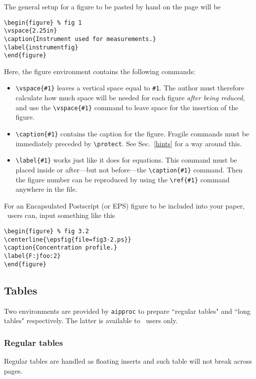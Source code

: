 The general setup for a figure to be pasted by hand  on the page will be
\se\begin{verbatim}
\begin{figure} % fig 1
\vspace{2.25in}
\caption{Instrument used for measurements.}
\label{instrumentfig}
\end{figure}
\end{verbatim}\ee
\noindent 
Here, the figure environment contains the following commands:
\begin{itemize}
 \item \verb+\vspace{#1}+ leaves a vertical space equal to \verb+#1+. The
   author must therefore calculate how much space will be needed for each
   figure {\it after being reduced}, and use the  \verb+\vspace{#1}+ command
   to leave space for the insertion of the figure.
 \item \verb+\caption{#1}+ contains the caption for the figure. Fragile
   commands must be immediately preceded by \verb+\protect+.
  See Sec.\ \ref{hints} for a way around this.
 \item \verb+\label{#1}+ works just like it does for equations. This command
   must be placed inside or after---but not before---the \verb+\caption{#1}+
   command. Then the figure number can be reproduced by using the
   \verb+\ref{#1}+ command anywhere in the file.
\end{itemize}

For an Encapsulated Postscript (or EPS) figure to
be included into your paper,
\latexe~users can, input something like this
\se\begin{verbatim}
\begin{figure} % fig 3.2
\centerline{\epsfig{file=fig3-2.ps}}
\caption{Concentration profile.}
\label{F:jfoo:2}
\end{figure}
\end{verbatim}\ee

\subsection{Tables}
\label{sec:tables}
Two environments are provided by \verb+aipproc+ to prepare ``regular tables"
and ``long tables" respectively. The latter is available to \latexe~users only.
 
\subsubsection{Regular tables}
Regular tables are handled as floating inserts
and such table will not break across pages.
 
